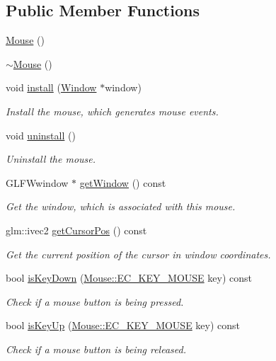 \subsection*{Public Member Functions}
\begin{DoxyCompactItemize}
\item 
\mbox{\hyperlink{classec_1_1_mouse_ac1154831feadd646ecabad6dc1d42136}{Mouse}} ()
\item 
\mbox{\hyperlink{classec_1_1_mouse_a49441335e64c7bf098217f0698975aa4}{$\sim$\+Mouse}} ()
\item 
void \mbox{\hyperlink{classec_1_1_mouse_a7e679de43ed15a8366d15ebf641c7b97}{install}} (\mbox{\hyperlink{classec_1_1_window}{Window}} $\ast$window)
\begin{DoxyCompactList}\small\item\em Install the mouse, which generates mouse events. \end{DoxyCompactList}\item 
void \mbox{\hyperlink{classec_1_1_mouse_afee0caa17130a35f9b94523776a6fffb}{uninstall}} ()
\begin{DoxyCompactList}\small\item\em Uninstall the mouse. \end{DoxyCompactList}\item 
G\+L\+F\+Wwindow $\ast$ \mbox{\hyperlink{classec_1_1_mouse_a7daf494a5600c6ffa5278e201b68963f}{get\+Window}} () const
\begin{DoxyCompactList}\small\item\em Get the window, which is associated with this mouse. \end{DoxyCompactList}\item 
glm\+::ivec2 \mbox{\hyperlink{classec_1_1_mouse_ac78aee81c618536c76a74852d344128d}{get\+Cursor\+Pos}} () const
\begin{DoxyCompactList}\small\item\em Get the current position of the cursor in window coordinates. \end{DoxyCompactList}\item 
bool \mbox{\hyperlink{classec_1_1_mouse_a3d5fd51a99aae2800604ecc5cb01ae21}{is\+Key\+Down}} (\mbox{\hyperlink{classec_1_1_mouse_acabdd3509adc381e415c60b29554e2fb}{Mouse\+::\+E\+C\+\_\+\+K\+E\+Y\+\_\+\+M\+O\+U\+SE}} key) const
\begin{DoxyCompactList}\small\item\em Check if a mouse button is being pressed. \end{DoxyCompactList}\item 
bool \mbox{\hyperlink{classec_1_1_mouse_a0e7b2dc5f3b7b9ea2a348fa7a44fb629}{is\+Key\+Up}} (\mbox{\hyperlink{classec_1_1_mouse_acabdd3509adc381e415c60b29554e2fb}{Mouse\+::\+E\+C\+\_\+\+K\+E\+Y\+\_\+\+M\+O\+U\+SE}} key) const
\begin{DoxyCompactList}\small\item\em Check if a mouse button is being released. \end{DoxyCompactList}\end{DoxyCompactItemize}
